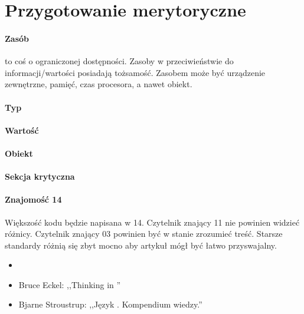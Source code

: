 \section{Przygotowanie merytoryczne}\label{sec:reader-profile}
\paragraph{Zasób}
 to coś o ograniczonej dostępności. Zasoby w przeciwieństwie do informacji/wartości posiadają tożsamość. Zasobem może być urządzenie zewnętrzne, pamięć, czas procesora, a nawet obiekt.

\paragraph{Typ}

\paragraph{Wartość}

\paragraph{Obiekt}

\paragraph{Sekcja krytyczna}

\paragraph{Znajomość \Cpp{}14}
Większość kodu będzie napisana w \Cpp{}14. Czytelnik znający \Cpp{}11 nie powinien widzieć różnicy. Czytelnik znający \Cpp{}03 powinien być w stanie zrozumieć treść. Starsze standardy różnią się zbyt mocno aby artykuł mógł być łatwo przyswajalny.
\begin{itemize}
\item {}
\item Bruce Eckel: ,,Thinking in \Cpp''
\item Bjarne Stroustrup: ,,Język \Cpp. Kompendium wiedzy.''
\end{itemize}

